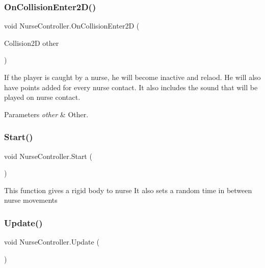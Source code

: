 \subsubsection{\texorpdfstring{On\+Collision\+Enter2\+D()}{OnCollisionEnter2D()}}
{\footnotesize\ttfamily void Nurse\+Controller.\+On\+Collision\+Enter2D (\begin{DoxyParamCaption}\item[{Collision2D}]{other }\end{DoxyParamCaption})\hspace{0.3cm}{\ttfamily [private]}}



If the player is caught by a nurse, he will become inactive and relaod. He will also have points added for every nurse contact. It also includes the sound that will be played on nurse contact. 


\begin{DoxyParams}{Parameters}
{\em other} & Other.\\
\hline
\end{DoxyParams}
\mbox{\label{class_nurse_controller_aa8fcc891957bbead5cfaa915045e3ded}} 
\subsubsection{\texorpdfstring{Start()}{Start()}}
{\footnotesize\ttfamily void Nurse\+Controller.\+Start (\begin{DoxyParamCaption}{ }\end{DoxyParamCaption})\hspace{0.3cm}{\ttfamily [private]}}



This function gives a rigid body to nurse It also sets a random time in between nurse movements 

\mbox{\label{class_nurse_controller_a3c52dfb2cfa34450a3b0c379cbff1202}} 
\subsubsection{\texorpdfstring{Update()}{Update()}}
{\footnotesize\ttfamily void Nurse\+Controller.\+Update (\begin{DoxyParamCaption}{ }\end{DoxyParamCaption})\hspace{0.3cm}{\ttfamily [private]}}



